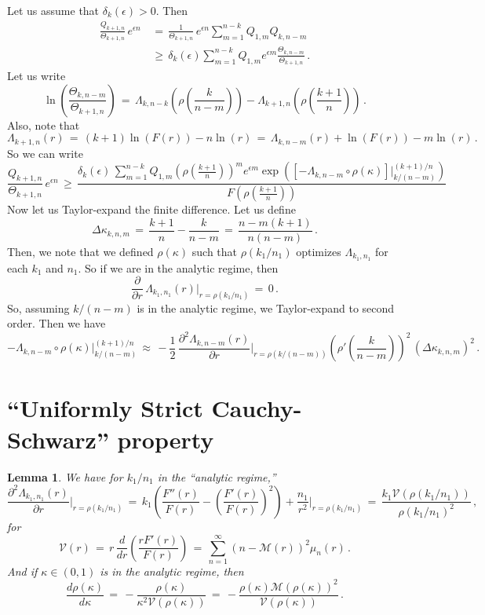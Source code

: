 \documentclass[12pt]{article}
\newtheorem{lemma}[thm]{Lemma}
\begin{document}
Let us assume that $\delta_k(\epsilon)>0$. Then
\begin{equation}
\begin{split}
\frac{Q_{k+1,n}}{\Theta_{k+1,n}}\, e^{\epsilon n}\, 
&=\, \frac{1}{\Theta_{k+1,n}}\, e^{\epsilon n }
\sum_{m=1}^{n-k} Q_{1,m} Q_{k,n-m}\\ 
&\geq\, \delta_k(\epsilon) \sum_{m=1}^{n-k} Q_{1,m} e^{\epsilon m }
\frac{\Theta_{k,n-m}}{\Theta_{k+1,n}}\, .
\end{split}
\end{equation}
Let us write
$$
\ln\left(\frac{\Theta_{k,n-m}}{\Theta_{k+1,n}}\right)\, =\, 
\Lambda_{k,n-k}\left(\rho\left(\frac{k}{n-m}\right)\right) - \Lambda_{k+1,n}\left(\rho\left(\frac{k+1}{n}\right)\right)\, .
$$
Also, note that
$$
\Lambda_{k+1,n}(r)\, =\, (k+1) \ln(F(r)) - n \ln(r)\, =\, \Lambda_{k,n-m}(r) + \ln(F(r)) -m \ln(r)\, .
$$
So we can write
\begin{equation}
\label{eq:FiniteDifference}
\frac{Q_{k+1,n}}{\Theta_{k+1,n}}\, e^{\epsilon n}\, 
\geq\, \frac{\delta_k(\epsilon)\, 
\sum_{m=1}^{n-k} Q_{1,m} \left(\rho\left(\frac{k+1}{n}\right)\right)^m e^{\epsilon m}
\exp\left(\left[ -\Lambda_{k,n-m}\circ \rho(\kappa)\right]\Bigg|_{k/(n-m)}^{(k+1)/n}\right)}{F\left(\rho\left(\frac{k+1}{n}\right)\right)}
\end{equation}
Now let us Taylor-expand the finite difference.
Let us define
$$
\Delta \kappa_{k,n,m}\, =\, \frac{k+1}{n} - \frac{k}{n-m}\, =\, \frac{n-m(k+1)}{n(n-m)}\, .
$$
Then, we note that we defined $\rho(\kappa)$ such that $\rho(k_1/n_1)$ optimizes $\Lambda_{k_1,n_1}$ for each $k_1$
and $n_1$.
So if we are in the analytic regime, then 
$$
\frac{\partial}{\partial r}\, \Lambda_{k_1,n_1}(r)\Bigg|_{r=\rho(k_1/n_1)}\, =\, 0\, .
$$
So, assuming $k/(n-m)$ is in the analytic regime, we Taylor-expand to second order.
Then we have
$$
-\Lambda_{k,n-m}\circ \rho(\kappa)\Bigg|_{k/(n-m)}^{(k+1)/n}\, \approx\, -\frac{1}{2}\, \frac{\partial^2 \Lambda_{k,n-m}(r)}{\partial r}\Bigg|_{r=\rho(k/(n-m))}
\left(\rho'\left(\frac{k}{n-m}\right)\right)^2\, \left(\Delta \kappa_{k,n,m}\right)^2\, .
$$

\section{``Uniformly Strict Cauchy-Schwarz'' property}

\begin{lemma}
We have for $k_1/n_1$ in the ``analytic regime,''
$$
\frac{\partial^2 \Lambda_{k_1,n_1}(r)}{\partial r} \Bigg|_{r=\rho(k_1/n_1)}\, =\, k_1 \left(\frac{F''(r)}{F(r)}-\left(\frac{F'(r)}{F(r)}\right)^2\right) + \frac{n_1}{r^2}\Bigg|_{r=\rho(k_1/n_1)}\,
=\, \frac{k_1 \mathcal{V}(\rho(k_1/n_1))}{\rho(k_1/n_1)^2}\, ,
$$
for
$$
\mathcal{V}(r)\, =\, r\, \frac{d}{dr} \left(\frac{r F'(r)}{F(r)}\right)\, =\, \sum_{n=1}^{\infty} \left(n - \mathcal{M}(r)\right)^2 \mu_n(r)\, .
$$
And if $\kappa \in (0,1)$ is in the analytic regime, then
$$
\frac{d\rho(\kappa)}{d\kappa}\, =\, -\frac{\rho(\kappa)}{\kappa^2 \mathcal{V}(\rho(\kappa))}\, =\, -\frac{\rho(\kappa) \mathcal{M}(\rho(\kappa))^2}{\mathcal{V}(\rho(\kappa))}\, .
$$
\end{lemma}
\end{document}
